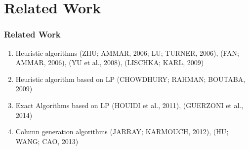 \documentclass[english]{beamer}
\begin{document}
\section{Related Work}
\begin{frame}
\frametitle{Related Work}
\pause
\begin{enumerate}
  \item Heuristic algorithms (ZHU; AMMAR, 2006; LU; TURNER, 2006), (FAN; AMMAR, 2006), (YU et al., 2008), (LISCHKA; KARL, 2009)
  \item Heuristic algorithm based on LP (CHOWDHURY; RAHMAN; BOUTABA, 2009)
  \item Exact Algorithms based on LP (HOUIDI et al., 2011), (GUERZONI et al., 2014)
  \item Column generation algorithms (JARRAY; KARMOUCH, 2012), (HU; WANG; CAO, 2013)
\end{enumerate}
\end{frame}
\end{document}

